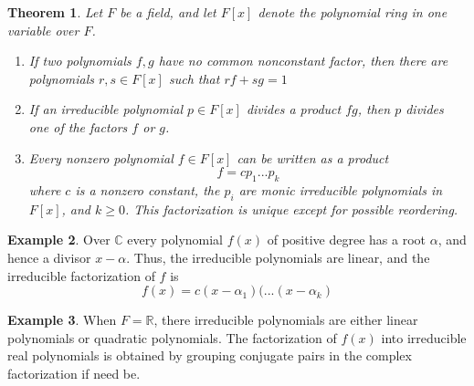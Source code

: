 \documentclass[12pt]{article}
\newtheorem{thm}{Theorem}[section]
\theoremstyle{definition}
\newtheorem{eg}[thm]{Example}
\theoremstyle{remark}
\numberwithin{equation}{section}
\newcommand\C{\mathbb C}    %
\newcommand\R{\mathbb R}    %
\begin{document}
\vspace{15pt}


\begin{thm}
        Let $F$ be a field, and let $F[x]$ denote the polynomial ring in one variable over $F$. \begin{enumerate}
                \item If two polynomials $f,g$ have no common nonconstant factor, then there are polynomials $r,s \in F[x]$ such that $rf + sg = 1$
                \item If an irreducible polynomial $p \in F[x]$ divides a product $fg$, then $p$ divides one of the factors $f$ or $g$.
                \item Every nonzero polynomial $f \in F[x]$ can be written as a product \begin{equation}
                                f = cp_1...p_k
                \end{equation}
                        where $c$ is a nonzero constant, the $p_i$ are monic irreducible polynomials in $F[x]$, and $k \geq 0$. This factorization is unique except for possible reordering.
        \end{enumerate}
\end{thm}


\vspace{15pt}

\begin{eg}
        Over $\C$ every polynomial $f(x)$ of positive degree has a root $\alpha$, and hence a divisor $x - \alpha$. Thus, the irreducible polynomials are linear, and the irreducible factorization of $f$ is \begin{equation}
                f(x) = c(x-\alpha_1)(...(x-\alpha_k)
        \end{equation}
\end{eg}

\vspace{15pt}

\begin{eg}
        When $F = \R$, there irreducible polynomials are either linear polynomials or quadratic polynomials. The factorization of $f(x)$ into irreducible real polynomials is obtained by grouping conjugate pairs in the complex factorization if need be.
\end{eg}


\vspace{15pt}
\end{document}
